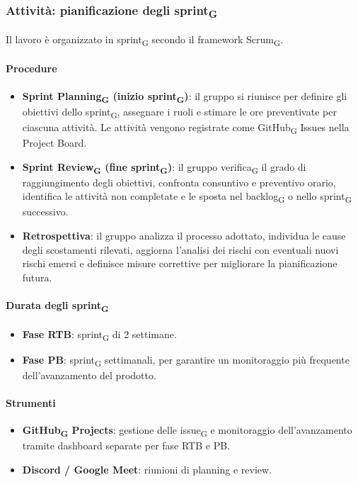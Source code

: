 \documentclass[11pt,a4paper]{article}
\newcommand{\gls}[1]{#1\textsubscript{G}}
\begin{document}
\subsubsection{Attività: pianificazione degli \gls{sprint}}
Il lavoro è organizzato in \gls{sprint} secondo il framework \gls{Scrum}.

\paragraph{Procedure}
\begin{itemize}
    \item \textbf{\gls{Sprint Planning} (inizio \gls{sprint})}: il gruppo si riunisce per definire gli obiettivi dello \gls{sprint}, assegnare i ruoli e stimare le ore preventivate per ciascuna attività. Le attività vengono registrate come \gls{GitHub} Issues nella Project Board.
    \item \textbf{\gls{Sprint Review} (fine \gls{sprint})}: il gruppo \gls{verifica} il grado di raggiungimento degli obiettivi, confronta consuntivo e preventivo orario, identifica le attività non completate e le sposta nel \gls{backlog} o nello \gls{sprint} successivo.
    \item \textbf{Retrospettiva}: il gruppo analizza il processo adottato,
    individua le cause degli scostamenti rilevati, aggiorna l'analisi dei
    rischi con eventuali nuovi rischi emersi e definisce misure correttive
    per migliorare la pianificazione futura.
\end{itemize}

\paragraph{Durata degli \gls{sprint}}
\begin{itemize}
    \item \textbf{Fase RTB}: \gls{sprint} di 2 settimane.
    \item \textbf{Fase PB}: \gls{sprint} settimanali, per garantire un monitoraggio più frequente dell'avanzamento del prodotto.
\end{itemize}

\paragraph{Strumenti}
\begin{itemize}
    \item \textbf{\gls{GitHub} Projects}: gestione delle \gls{issue} e monitoraggio dell'avanzamento tramite dashboard separate per fase RTB e PB.
    \item \textbf{Discord / Google Meet}: riunioni di planning e review.
\end{itemize}
\end{document}
